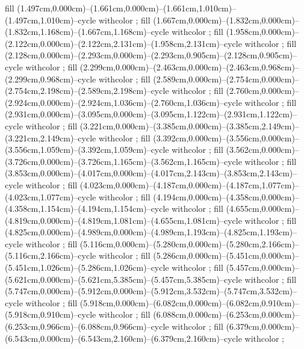 {fill (1.497cm,0.000cm)--(1.661cm,0.000cm)--(1.661cm,1.010cm)--(1.497cm,1.010cm)--cycle withcolor ;
fill (1.667cm,0.000cm)--(1.832cm,0.000cm)--(1.832cm,1.168cm)--(1.667cm,1.168cm)--cycle withcolor ;
fill (1.958cm,0.000cm)--(2.122cm,0.000cm)--(2.122cm,2.131cm)--(1.958cm,2.131cm)--cycle withcolor ;
fill (2.128cm,0.000cm)--(2.293cm,0.000cm)--(2.293cm,0.905cm)--(2.128cm,0.905cm)--cycle withcolor ;
fill (2.299cm,0.000cm)--(2.463cm,0.000cm)--(2.463cm,0.968cm)--(2.299cm,0.968cm)--cycle withcolor ;
fill (2.589cm,0.000cm)--(2.754cm,0.000cm)--(2.754cm,2.198cm)--(2.589cm,2.198cm)--cycle withcolor ;
fill (2.760cm,0.000cm)--(2.924cm,0.000cm)--(2.924cm,1.036cm)--(2.760cm,1.036cm)--cycle withcolor ;
fill (2.931cm,0.000cm)--(3.095cm,0.000cm)--(3.095cm,1.122cm)--(2.931cm,1.122cm)--cycle withcolor ;
fill (3.221cm,0.000cm)--(3.385cm,0.000cm)--(3.385cm,2.149cm)--(3.221cm,2.149cm)--cycle withcolor ;
fill (3.392cm,0.000cm)--(3.556cm,0.000cm)--(3.556cm,1.059cm)--(3.392cm,1.059cm)--cycle withcolor ;
fill (3.562cm,0.000cm)--(3.726cm,0.000cm)--(3.726cm,1.165cm)--(3.562cm,1.165cm)--cycle withcolor ;
fill (3.853cm,0.000cm)--(4.017cm,0.000cm)--(4.017cm,2.143cm)--(3.853cm,2.143cm)--cycle withcolor ;
fill (4.023cm,0.000cm)--(4.187cm,0.000cm)--(4.187cm,1.077cm)--(4.023cm,1.077cm)--cycle withcolor ;
fill (4.194cm,0.000cm)--(4.358cm,0.000cm)--(4.358cm,1.154cm)--(4.194cm,1.154cm)--cycle withcolor ;
fill (4.655cm,0.000cm)--(4.819cm,0.000cm)--(4.819cm,1.081cm)--(4.655cm,1.081cm)--cycle withcolor ;
fill (4.825cm,0.000cm)--(4.989cm,0.000cm)--(4.989cm,1.193cm)--(4.825cm,1.193cm)--cycle withcolor ;
fill (5.116cm,0.000cm)--(5.280cm,0.000cm)--(5.280cm,2.166cm)--(5.116cm,2.166cm)--cycle withcolor ;
fill (5.286cm,0.000cm)--(5.451cm,0.000cm)--(5.451cm,1.026cm)--(5.286cm,1.026cm)--cycle withcolor ;
fill (5.457cm,0.000cm)--(5.621cm,0.000cm)--(5.621cm,5.385cm)--(5.457cm,5.385cm)--cycle withcolor ;
fill (5.747cm,0.000cm)--(5.912cm,0.000cm)--(5.912cm,3.532cm)--(5.747cm,3.532cm)--cycle withcolor ;
fill (5.918cm,0.000cm)--(6.082cm,0.000cm)--(6.082cm,0.910cm)--(5.918cm,0.910cm)--cycle withcolor ;
fill (6.088cm,0.000cm)--(6.253cm,0.000cm)--(6.253cm,0.966cm)--(6.088cm,0.966cm)--cycle withcolor ;
fill (6.379cm,0.000cm)--(6.543cm,0.000cm)--(6.543cm,2.160cm)--(6.379cm,2.160cm)--cycle withcolor ;
}
